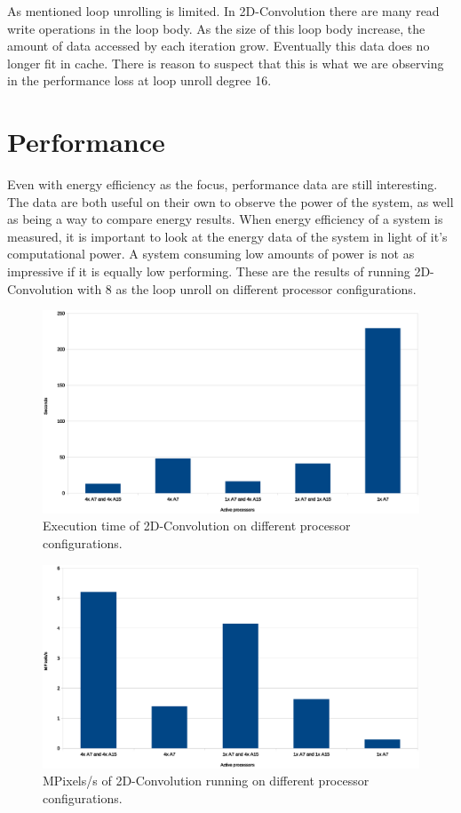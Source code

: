 As mentioned loop unrolling is limited.
In 2D-Convolution there are many read write operations in the loop body.
As the size of this loop body increase, the amount of data accessed by each iteration grow.
Eventually this data does no longer fit in cache.
There is reason to suspect that this is what we are observing in the performance loss at loop unroll degree 16.

\section{Performance}
Even with energy efficiency as the focus, performance data are still interesting.
The data are both useful on their own to observe the power of the system, as well as being a way to compare energy results.
When energy efficiency of a system is measured, it is important to look at the energy data of the system in light of it's computational power.
A system consuming low amounts of power is not as impressive if it is equally low performing.
These are the results of running 2D-Convolution with 8 as the loop unroll on different processor configurations.

\begin{figure}[H]
  \centering
  \includegraphics[width=160mm]{fig/execution-time-configurations.eps}
  \caption{Execution time of 2D-Convolution on different processor configurations. \label{overflow}}
\end{figure}

\begin{figure}[H]
  \centering
  \includegraphics[width=160mm]{fig/mpixelss-configurations.eps}
  \caption{MPixels/s of 2D-Convolution running on different processor configurations. \label{overflow}}
\end{figure}

